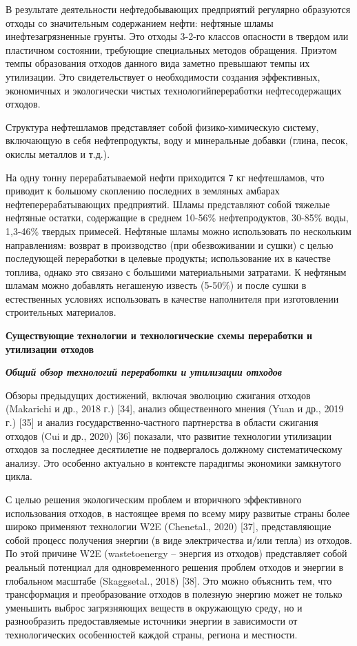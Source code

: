 \begin{multicols}{2}
В результате деятельности нефтедобывающих предприятий регулярно
образуются отходы со значительным содержанием нефти: нефтяные шламы
инефтезагрязненные грунты. Это отходы 3-2-го классов опасности в твердом
или пластичном состоянии, требующие специальных методов обращения.
Приэтом темпы образования отходов данного вида заметно превышают темпы
их утилизации. Это свидетельствует о необходимости создания эффективных,
экономичных и экологически чистых технологийпереработки нефтесодержащих
отходов.

Структура нефтешламов представляет собой физико-химическую систему,
включающую в себя нефтепродукты, воду и минеральные добавки (глина,
песок, окислы металлов и т.д.).

На одну тонну перерабатываемой нефти приходится 7 кг нефтешламов, что
приводит к большому скоплению последних в земляных амбарах
нефтеперерабатывающих предприятий. Шламы представляют собой тяжелые
нефтяные остатки, содержащие в среднем 10-56\% нефтепродуктов, 30-85\%
воды, 1,3-46\% твердых примесей. Нефтяные шламы можно использовать по
нескольким направлениям: возврат в производство (при обезвоживании и
сушки) с целью последующей переработки в целевые продукты; использование
их в качестве топлива, однако это связано с большими материальными
затратами. К нефтяным шламам можно добавлять негашеную известь (5-50\%)
и после сушки в естественных условиях использовать в качестве
наполнителя при изготовлении строительных материалов.

{\bfseries Существующие технологии и технологические схемы переработки и
утилизации отходов}

\emph{{\bfseries Общий обзор технологий переработки и утилизации отходов}}

Обзоры предыдущих достижений, включая эволюцию сжигания отходов
(Makarichi и др., 2018 г.) {[}34{]}, анализ общественного мнения (Yuan и
др., 2019 г.) {[}35{]} и анализ государственно-частного партнерства в
области сжигания отходов (Cui и др., 2020) {[}36{]} показали, что
развитие технологии утилизации отходов за последнее десятилетие не
подвергалось должному систематическому анализу. Это особенно актуально в
контексте парадигмы экономики замкнутого цикла.

С целью решения экологическим проблем и вторичного эффективного
использования отходов, в настоящее время по всему миру развитые страны
более широко применяют технологии W2E (Chenetal., 2020) {[}37{]},
представляющие собой процесс получения энергии (в виде электричества
и/или тепла) из отходов. По этой причине W2E (wastetoenergy -- энергия
из отходов) представляет собой реальный потенциал для одновременного
решения проблем отходов и энергии в глобальном масштабе (Skaggsetal.,
2018) {[}38{]}. Это можно объяснить тем, что трансформация и
преобразование отходов в полезную энергию может не только уменьшить
выброс загрязняющих веществ в окружающую среду, но и разнообразить
предоставляемые источники энергии в зависимости от технологических
особенностей каждой страны, региона и местности.
\end{multicols}

